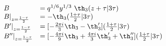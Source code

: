 \begin{equation}
    \begin{array}{ll} 
      B &= q^{1/6} y^{1/3} ~\th_3(z+\tau|3\tau)\\ 
      B|_{z={1-\tau\over 2}} &= - \th_3({1+\tau\over 2}|3\tau)\\ 
      B'|_{z={1-\tau\over 2}} &= [-{2\pi i\over 3} \th_3
          -\th_3']({1+\tau\over 2}|3\tau) \\ 
      B''|_{z={1-\tau\over 2}} &= [ -{4\pi i\over 9} \th_3 +
         {4\pi i\over 3} \th_3' + \th_3'']({1+\tau\over 2}|3\tau)
     \end{array}
\end{equation}

